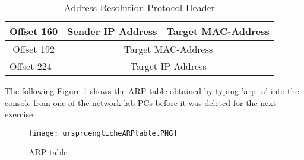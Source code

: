 \begin{table}[H]
\begin{tabular}{|c|c|c|c|c|c|c|c|c|}
		Offset 160                       & \multicolumn{4}{c|}{Sender IP Address}                                                                                                                                                                & \multicolumn{4}{c|}{Target MAC-Address}                 \\ \hline
		Offset 192                       & \multicolumn{8}{c|}{Target MAC-Address}                                                                                                                                                                                                                         \\ \hline
		\multicolumn{1}{|l|}{Offset 224} & \multicolumn{8}{c|}{Target IP-Address}                                                                                                                                                                                                                          \\ \hline
	\end{tabular}
	\caption{Address Resolution Protocol Header}
\end{table}
 
The following Figure \ref{arp-table} shows the ARP table obtained by typing 'arp -a' into the console from one of the network lab PCs before it was deleted for the next exercise:
\begin{figure}[H]
	\centering
	\texttt{[image: urspruenglicheARPtable.PNG]}
	\caption{ARP table}
	\label{arp-table}
\end{figure} 
